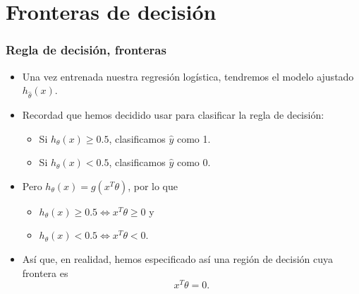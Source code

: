 \documentclass{beamer}
\begin{document}
 \section{Fronteras de decisión}
 \begin{frame}\frametitle{Regla de decisión, fronteras}
   \begin{itemize}
   \item    Una vez entrenada nuestra regresión logística, tendremos el modelo ajustado $h_{\hat{\theta}}(x)$.
   \item<2->  Recordad que hemos  decidido usar para clasificar la regla de decisión:
     \begin{itemize}
     \item Si $h_\theta(x)\geq 0.5$, clasificamos $\hat{y}$ como 1.
     \item Si $h_\theta(x)<0.5$, clasificamos $\hat{y}$ como 0.
     \end{itemize}
   \item<3-> Pero $h_\theta(x)=g(x^T\theta)$, por lo que 
     \begin{itemize}
     \item $h_\theta(x)\geq 0.5\Leftrightarrow x^T\theta\geq 0$ y
     \item $h_\theta(x)< 0.5\Leftrightarrow x^T\theta<0$. 
     \end{itemize}
   \item<4-> Así que, en realidad, hemos especificado así una región de decisión cuya frontera es $$x^T\theta=0.$$
   \end{itemize}
   
 \end{frame}
\end{document}

